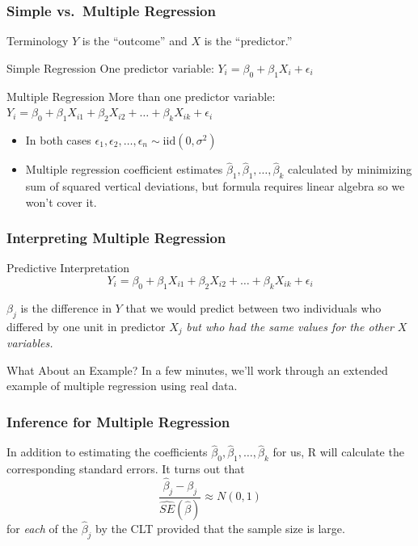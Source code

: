 \documentclass[handout]{beamer}
\begin{document}
\begin{frame}
\frametitle{Simple vs.\ Multiple Regression}
\begin{block}{Terminology}
$Y$ is the ``outcome'' and $X$ is the ``predictor.''
\end{block}

\begin{block}{Simple Regression}
One predictor variable: $Y_i = \beta_0 + \beta_1 X_i + \epsilon_i$
\end{block}
\begin{block}{Multiple Regression}
More than one predictor variable: $Y_i = \beta_0 + \beta_1 X_{i1} + \beta_2 X_{i2} +  \hdots + \beta_k X_{ik} + \epsilon_i$
\end{block}


\begin{itemize}
	\item In both cases $\epsilon_1, \epsilon_2, \hdots, \epsilon_n \sim \mbox{iid} (0,\sigma^2)$
	\item Multiple regression coefficient estimates $\widehat{\beta}_1, \widehat{\beta}_1, \hdots, \widehat{\beta}_k$ calculated by minimizing  sum of squared vertical deviations, but formula requires linear algebra so we won't cover it.
\end{itemize}
\end{frame}


\begin{frame}
\frametitle{Interpreting Multiple Regression}

\begin{block}{Predictive Interpretation}
$$Y_i = \beta_0 + \beta_1 X_{i1} + \beta_2 X_{i2} +  \hdots + \beta_k X_{ik} + \epsilon_i$$

$\beta_j$ is the difference in $Y$ that we would predict between two individuals who differed by one unit in predictor $X_j$ \emph{\alert{but who had the same values for the other $X$ variables.}} 

\end{block}

\begin{block}{What About an Example?}
	In a few minutes, we'll work through an extended example of multiple regression using real data.
\end{block}
\end{frame}

\begin{frame}
\frametitle{Inference for Multiple Regression}

In addition to estimating the coefficients $\widehat{\beta}_0, \widehat{\beta}_1, \hdots, \widehat{\beta}_k$ for us, R will calculate the corresponding standard errors. It turns out that
	$$\frac{\widehat{\beta}_j - \beta_j}{\widehat{SE}(\widehat{\beta})} \approx N(0,1)$$
for \emph{each} of the $\widehat{\beta}_j$ by the CLT provided that the sample size is large.

\end{frame}
\end{document}
